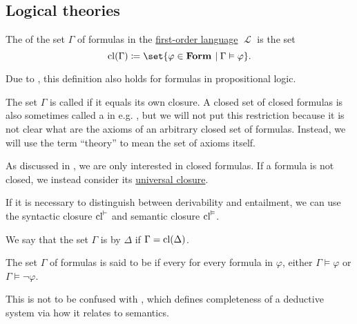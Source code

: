 \subsection{Logical theories}\label{subsec:logical_theories}

\begin{definition}\label{def:first_order_theory}
  The  of the set \( \Gamma \) of formulas in the \hyperref[def:first_order_syntax]{first-order language} \( \mscrL \) is the set
  \begin{equation*}
    \cl(\Gamma) \coloneqq \set{ \varphi \in \boldop{Form} \given \Gamma \vDash \varphi }.
  \end{equation*}

  Due to , this definition also holds for formulas in propositional logic.

  The set \( \Gamma \) is called  if it equals its own closure. A closed set of closed formulas is also sometimes called a  in e.g. \cite[def. 33.1]{OpenLogicFull}, but we will not put this restriction because it is not clear what are the axioms of an arbitrary closed set of formulas. Instead, we will use the term \enquote{theory} to mean the set of axioms itself.

  As discussed in , we are only interested in closed formulas. If a formula is not closed, we instead consider its \hyperref[thm:implicit_universal_quantification]{universal closure}.

  If it is necessary to distinguish between derivability and entailment, we can use the syntactic closure \( \operatorname{cl}^\vdash \) and semantic closure \( \operatorname{cl}^\vDash \).

  \begin{thmenum}
     We say that the set \( \Gamma \) is  by \( \Delta \) if \( \Gamma = \operatorname{cl}(\Delta) \).

    \medskip

     The set \( \Gamma \) of formulas is said to be  if every for every formula in \( \varphi \), either \( \Gamma \vDash \varphi \) or \( \Gamma \vDash \neg \varphi \).

    This is not to be confused with , which defines completeness of a deductive system via how it relates to semantics.
  \end{thmenum}
\end{definition}

